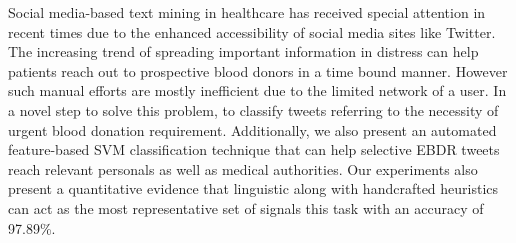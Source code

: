 Social media-based text mining in healthcare has received special attention in recent times due to the enhanced accessibility of social media sites like Twitter. The increasing trend of spreading important information in distress can help patients reach out to prospective blood donors in a time bound manner. However such manual efforts are mostly inefficient due to the limited network of a user. In a novel step to solve this problem, to classify tweets referring to the necessity of urgent blood donation requirement. Additionally, we also present an automated feature-based SVM classification technique that can help selective EBDR tweets reach relevant personals as well as medical authorities. Our experiments also present a quantitative evidence that linguistic along with handcrafted heuristics can act as the most representative set of signals this task with an accuracy of 97.89\%.
